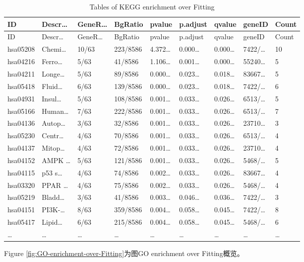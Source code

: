 \documentclass[
]{article}
\begin{document}
\begin{longtable}[]{@{}lllllllll@{}}
\caption{\label{tab:tables-of-KEGG-enrichment-over-Fitting}Tables of KEGG enrichment over Fitting}\tabularnewline
\toprule
ID & Descr\ldots{} & GeneR\ldots{} & BgRatio & pvalue & p.adjust & qvalue & geneID & Count\tabularnewline
\midrule
\endfirsthead
\toprule
ID & Descr\ldots{} & GeneR\ldots{} & BgRatio & pvalue & p.adjust & qvalue & geneID & Count\tabularnewline
\midrule
\endhead
hsa05208 & Chemi\ldots{} & 10/63 & 223/8586 & 4.372\ldots{} & 0.000\ldots{} & 0.000\ldots{} & 7422/\ldots{} & 10\tabularnewline
hsa04216 & Ferro\ldots{} & 5/63 & 41/8586 & 1.106\ldots{} & 0.001\ldots{} & 0.000\ldots{} & 55240\ldots{} & 5\tabularnewline
hsa04211 & Longe\ldots{} & 5/63 & 89/8586 & 0.000\ldots{} & 0.023\ldots{} & 0.018\ldots{} & 83667\ldots{} & 5\tabularnewline
hsa05418 & Fluid\ldots{} & 6/63 & 139/8586 & 0.000\ldots{} & 0.023\ldots{} & 0.018\ldots{} & 7422/\ldots{} & 6\tabularnewline
hsa04931 & Insul\ldots{} & 5/63 & 108/8586 & 0.001\ldots{} & 0.033\ldots{} & 0.026\ldots{} & 6513/\ldots{} & 5\tabularnewline
hsa05166 & Human\ldots{} & 7/63 & 222/8586 & 0.001\ldots{} & 0.033\ldots{} & 0.026\ldots{} & 6513/\ldots{} & 7\tabularnewline
hsa04136 & Autop\ldots{} & 3/63 & 32/8586 & 0.001\ldots{} & 0.033\ldots{} & 0.026\ldots{} & 23710\ldots{} & 3\tabularnewline
hsa05230 & Centr\ldots{} & 4/63 & 70/8586 & 0.001\ldots{} & 0.033\ldots{} & 0.026\ldots{} & 6513/\ldots{} & 4\tabularnewline
hsa04137 & Mitop\ldots{} & 4/63 & 72/8586 & 0.001\ldots{} & 0.033\ldots{} & 0.026\ldots{} & 23710\ldots{} & 4\tabularnewline
hsa04152 & AMPK \ldots{} & 5/63 & 121/8586 & 0.001\ldots{} & 0.033\ldots{} & 0.026\ldots{} & 5468/\ldots{} & 5\tabularnewline
hsa04115 & p53 s\ldots{} & 4/63 & 74/8586 & 0.002\ldots{} & 0.033\ldots{} & 0.026\ldots{} & 83667\ldots{} & 4\tabularnewline
hsa03320 & PPAR \ldots{} & 4/63 & 75/8586 & 0.002\ldots{} & 0.033\ldots{} & 0.026\ldots{} & 5468/\ldots{} & 4\tabularnewline
hsa05219 & Bladd\ldots{} & 3/63 & 41/8586 & 0.003\ldots{} & 0.046\ldots{} & 0.036\ldots{} & 7422/\ldots{} & 3\tabularnewline
hsa04151 & PI3K-\ldots{} & 8/63 & 359/8586 & 0.004\ldots{} & 0.058\ldots{} & 0.045\ldots{} & 7422/\ldots{} & 8\tabularnewline
hsa05417 & Lipid\ldots{} & 6/63 & 215/8586 & 0.004\ldots{} & 0.058\ldots{} & 0.045\ldots{} & 5468/\ldots{} & 6\tabularnewline
\ldots{} & \ldots{} & \ldots{} & \ldots{} & \ldots{} & \ldots{} & \ldots{} & \ldots{} & \ldots{}\tabularnewline
\bottomrule
\end{longtable}

Figure \ref{fig:GO-enrichment-over-Fitting}为图GO enrichment over Fitting概览。
\end{document}
